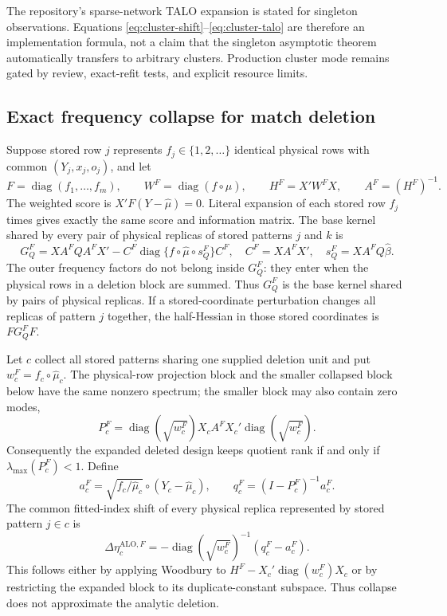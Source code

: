 \documentclass[11pt]{article}
\newcommand{\diag}{\operatorname{diag}}
\newcommand{\ALO}{\mathrm{ALO}}
\begin{document}
The repository's sparse-network TALO expansion is stated for singleton
observations.  Equations \eqref{eq:cluster-shift}--\eqref{eq:cluster-talo} are
therefore an implementation formula, not a claim that the singleton
asymptotic theorem automatically transfers to arbitrary clusters.  Production
cluster mode remains gated by review, exact-refit tests, and explicit resource
limits.

\subsection{Exact frequency collapse for match deletion}

Suppose stored row $j$ represents $f_j\in\{1,2,\ldots\}$ identical physical
rows with common $(Y_j,x_j,o_j)$, and let
\[
 F=\diag(f_1,\ldots,f_m),\qquad
 W^F=\diag(f\circ\widehat\mu),\qquad
 H^F=X'W^F X,\qquad A^F=(H^F)^{-1}.
\]
The weighted score is $X'F(Y-\widehat\mu)=0$. Literal expansion of each stored
row $f_j$ times gives exactly the same score and information matrix. The base
kernel shared by every pair of physical replicas of stored patterns $j$ and
$k$ is
\begin{equation}
 G_Q^F=XA^FQA^FX'-C^F\diag\{f\circ\widehat\mu\circ s_Q^F\}C^F,
 \quad C^F=XA^FX',\quad s_Q^F=XA^FQ\widehat\beta .       \label{eq:Gfreq}
\end{equation}
The outer frequency factors do not belong inside $G_Q^F$: they enter when the
physical rows in a deletion block are summed.
Thus $G_Q^F$ is the base kernel shared by pairs of physical replicas. If a
stored-coordinate perturbation changes all replicas of pattern $j$ together,
the half-Hessian in those stored coordinates is $FG_Q^FF$.

Let $c$ collect all stored patterns sharing one supplied deletion unit and
put $w_c^F=f_c\circ\widehat\mu_c$. The physical-row projection block and the
smaller collapsed block below have the same nonzero spectrum; the smaller
block may also contain zero modes,
\begin{equation}
 P_c^F=\diag(\sqrt{w_c^F})X_cA^FX_c'
       \diag(\sqrt{w_c^F}).                              \label{eq:Pfreq}
\end{equation}
Consequently the expanded deleted design keeps quotient rank if and only if
$\lambda_{\max}(P_c^F)<1$. Define
\[
 a_c^F=\sqrt{f_c/\widehat\mu_c}\circ
       (Y_c-\widehat\mu_c),\qquad
 q_c^F=(I-P_c^F)^{-1}a_c^F.
\]
The common fitted-index shift of every physical replica represented by stored
pattern $j\in c$ is
\begin{equation}
 \Delta\eta_c^{\ALO,F}
 =-\diag(\sqrt{w_c^F})^{-1}(q_c^F-a_c^F).               \label{eq:freq-shift}
\end{equation}
This follows either by applying Woodbury to
$H^F-X_c'\diag(w_c^F)X_c$ or by restricting the expanded block to its
duplicate-constant subspace. Thus collapse does not approximate the analytic
deletion.
\end{document}
